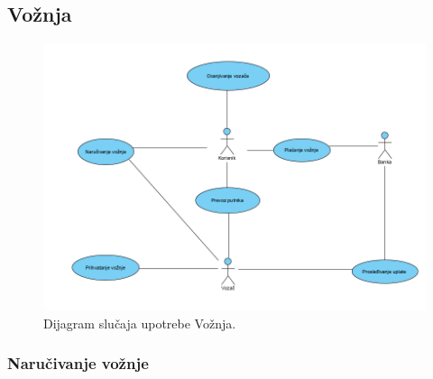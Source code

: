\subsection{\bfseries Vožnja}
\begin{figure}[H]
\begin{center}
\includegraphics[scale=0.7]{Slike/VoznjaUseCase.png}
\end{center}
    \caption{Dijagram slučaja upotrebe Vožnja.}
\label{fig:Vožnja}
\end{figure}


\subsubsection{\bfseries Naručivanje vožnje}

